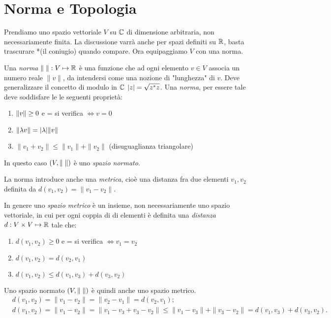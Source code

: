\chapter{Norma e Topologia}
Prendiamo uno spazio vettoriale $V$ su $\mathbb C$ di dimensione arbitraria, non
necessariamente finita. La discussione varrà anche per spazi definiti su
$\mathbb R$, basta trascurare *(il coniugio) quando compare. Ora equipaggiamo $V$
con una norma.
\begin{definition}
Una \emph{norma} $\| \; \|: V \mapsto \mathbb R$ è una funzione che ad ogni elemento
$v \in V$ associa un numero reale $\|v\|$, da intendersi come una nozione di
"lunghezza" di $v$. Deve generalizzare il concetto di modulo in $\mathbb C$ 
${\left|z\right|} = \sqrt{z^* z}$. Una \emph{norma}, per essere tale deve soddisfare le
le seguenti proprietà:
\begin{enumerate}[1)]
	\item ${\|v\|} \geq 0$ e = si verifica $\iff v = 0$
	\item ${\|\lambda v\|} = {\left|\lambda\right|} {\|v\|}$
	\item $\|v_1 + v_2\| \leq \|v_1\| + \|v_2\|$ (disuguaglianza triangolare)
\end{enumerate}
In questo caso $\left(V, {\|\;\|} \right)$ è uno \emph{spazio normato}.
\end{definition}
La norma introduce anche una \emph{metrica}, cioè una distanza fra due elementi
$v_1, v_2$ definita da $d(v_1, v_2) = \|v_1 - v_2\|$. 
\begin{definition}
In genere uno \emph{spazio metrico} è un insieme, non necessariamente uno
spazio vettoriale, in cui per ogni coppia di di elementi è definita una
\emph{distanza} $d: V \times V \mapsto \mathbb R$ tale che:
\begin{enumerate}[1)]
	\item $d(v_1, v_2) \geq 0$ e = si verifica $\iff v_1 = v_2$
	\item $d(v_1, v_2) = d(v_2, v_1)$
	\item $d(v_1, v_2) \leq d(v_1, v_3) + d(v_3, v_2)$
\end{enumerate}
\end{definition}
Uno spazio normato $\left(V, {\|\;\|} \right)$ è quindi anche uno spazio metrico.
\begin{align*}
	&d(v_1, v_2) = \|v_1 - v_2\| = \|v_2 - v_1\| = d(v_2, v_1) ;\\ 
	&d(v_1, v_2) = \|v_1 - v_2\| = \|v_1 - v_3 +v_3 -v_2 \| \leq
	\|v_1 - v_3\| + \|v_3 - v_2\| = d(v_1, v_3) + d(v_3, v_2).
\end{align*}
